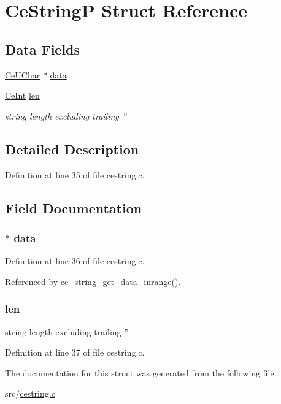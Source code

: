 \hypertarget{struct___ce_string_p}{
\section{CeStringP Struct Reference}
\label{struct___ce_string_p}
}
\subsection*{Data Fields}
\begin{DoxyCompactItemize}
\item 
\hyperlink{cetypes_8h_a3a94319866313b53b54825af2ba77e8d}{CeUChar} $\ast$ \hyperlink{struct___ce_string_p_a712dda5f9433ebba132fec7b76e46c0b}{data}
\item 
\hyperlink{cetypes_8h_aced3fca6c74c98a0a7c07757af07abca}{CeInt} \hyperlink{struct___ce_string_p_a3b1e093b841399b8de9feb53c583451d}{len}
\begin{DoxyCompactList}\small\item\em string length excluding trailing '' \item\end{DoxyCompactList}\end{DoxyCompactItemize}


\subsection{Detailed Description}


Definition at line 35 of file cestring.c.

\subsection{Field Documentation}
\hypertarget{struct___ce_string_p_a712dda5f9433ebba132fec7b76e46c0b}{
\subsubsection[{data}]{$\ast$ {\bf data}}}
\label{struct___ce_string_p_a712dda5f9433ebba132fec7b76e46c0b}


Definition at line 36 of file cestring.c.

Referenced by ce\_\-string\_\-get\_\-data\_\-inrange().\hypertarget{struct___ce_string_p_a3b1e093b841399b8de9feb53c583451d}{
\subsubsection[{len}]{ {\bf len}}}
\label{struct___ce_string_p_a3b1e093b841399b8de9feb53c583451d}


string length excluding trailing '' 

Definition at line 37 of file cestring.c.

The documentation for this struct was generated from the following file:\begin{DoxyCompactItemize}
\item 
src/\hyperlink{cestring_8c}{cestring.c}\end{DoxyCompactItemize}
